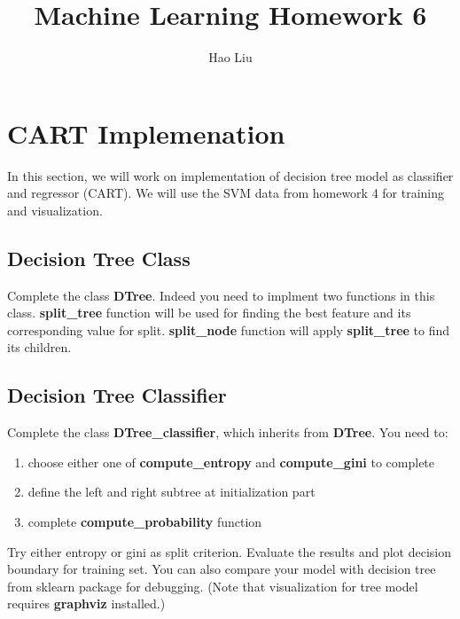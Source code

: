 \documentclass[12pt]{article}
\begin{document}
 
 
 
\title{Machine Learning Homework 6 }%
\author{Hao Liu} %
 
\maketitle

\section{CART Implemenation}

 In this section, we will work on implementation of decision tree model as classifier and regressor (CART). We will use the SVM data from homework 4 for training and visualization.
 
\subsection{Decision Tree Class}
Complete the class \textbf{DTree}. Indeed you need to implment two functions in this class. \textbf{split\_tree} function will be used for finding the best feature and its corresponding value for split. \textbf{split\_node} function will apply \textbf{split\_tree} to find its children.

\subsection{Decision Tree Classifier}
Complete the class \textbf{DTree\_classifier}, which inherits from \textbf{DTree}. You need to: 
\begin{enumerate}
	\item choose either one of \textbf{compute\_entropy} and \textbf{compute\_gini} to complete
	\item define the left and right subtree at initialization part
	\item complete \textbf{compute\_probability} function
\end{enumerate}
Try either entropy or gini as split criterion. Evaluate the results and plot decision boundary for training set. You can also compare your model with decision tree from sklearn package for debugging. (Note that visualization for tree model requires \textbf{graphviz} installed.)
\end{document}

